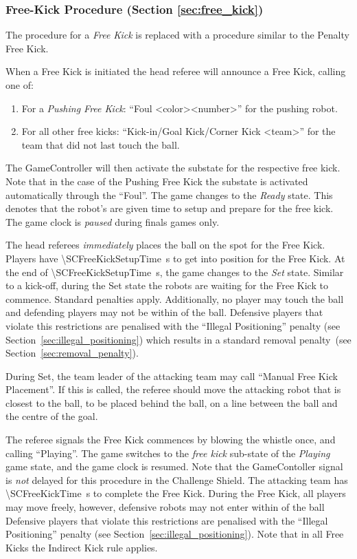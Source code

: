 \subsubsection{Free-Kick Procedure (Section \ref{sec:free_kick})}

The procedure for a \emph{Free Kick} is replaced with a procedure similar to the Penalty Free Kick.

When a Free Kick is initiated the head referee will announce a Free Kick, calling one of:
\begin{enumerate}
  \item For a \textit{Pushing Free Kick}: ``Foul \textless color\textgreater \textless number\textgreater'' for the pushing robot.
  \item For all other free kicks: ``Kick-in/Goal Kick/Corner Kick \textless team\textgreater'' for the team that did not last touch the ball.
\end{enumerate}

The GameController will then activate the substate for the respective free kick. Note that in the case of the Pushing Free Kick the substate is activated automatically through the ``Foul''.
The game changes to the \textit{Ready} state.
This denotes that the robot's are given time to setup and prepare for the free kick.
The game clock is \textit{paused} during finals games only.

The head referees \emph{immediately} places the ball on the spot for the Free Kick.
Players have \qty{\SCFreeKickSetupTime}{\second} to get into position for the Free Kick.
At the end of \qty{\SCFreeKickSetupTime}{\second}, the game changes to the \textit{Set} state.
Similar to a kick-off, during the Set state the robots are waiting for the Free Kick to commence.
Standard penalties apply.
Additionally, no player may touch the ball and defending players may not be within \FreeKickRadius of the ball.
Defensive players that violate this restrictions are penalised with the ``Illegal Positioning'' penalty (see Section~\ref{sec:illegal_positioning}) which results in a standard removal penalty~(see Section~\ref{sec:removal_penalty}).

During Set, the team leader of the attacking team may call ``Manual Free Kick Placement''.
If this is called, the referee should move the attacking robot that is closest to the ball, to be placed \SCFreeKickDistance behind the ball, on a line between the ball and the centre of the goal.

The referee signals the Free Kick commences by blowing the whistle once, and calling ``Playing''.
The game switches to the \textit{free kick} sub-state of the \textit{Playing} game state, and the game clock is resumed.
Note that the GameContoller signal is \emph{not} delayed for this procedure in the Challenge Shield.
The attacking team has \qty{\SCFreeKickTime}{\second} to complete the Free Kick.
During the Free Kick, all players may move freely, however, defensive robots may not enter within \FreeKickRadius of the ball Defensive players that violate this restrictions are penalised with the ``Illegal Positioning'' penalty (see Section~\ref{sec:illegal_positioning}).
Note that in all Free Kicks the Indirect Kick rule applies.


